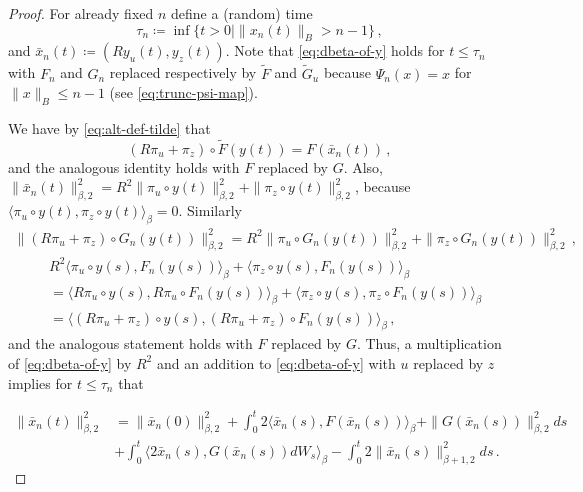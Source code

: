 \documentclass[final]{amsart}
\numberwithin{thm}{section}
\numberwithin{equation}{section}
\newcommand{\ip}[2]{\langle #1, #2 \rangle}
\begin{document}
\begin{proof}
For already fixed $n$ define a (random) time
  \begin{equation}\label{eq:def-tau-n}
        \tau_n \coloneqq \inf\{t > 0 \mid \|x_n(t)\|_B > n - 1\} \,,
    \end{equation}
and $\bar x_n(t) \coloneqq (Ry_u(t), y_z(t))$.
Note that \eqref{eq:dbeta-of-y} holds for $t\leq \tau_n$ with 
$F_n$ and $G_n$ replaced respectively by $\tilde{F}$ and $\tilde{G}_u$ because $\Psi_n(x) = x$ for $\|x\|_B \leq n - 1$ (see \eqref{eq:trunc-psi-map}). 
  
 



  

    
We have by \eqref{eq:alt-def-tilde} that
    $$
    (R\pi_u + \pi_z)\circ \tilde{F}(y(t)) = 
    F(\bar{x}_n(t)) \,,$$
    and the analogous identity holds with $F$ replaced by $G$. Also, $\|\bar{x}_n(t)\|_{\beta,2}^2 = R^2\|\pi_u \circ y(t)\|_{\beta,2}^2 + \|\pi_z \circ y(t)\|_{\beta,2}^2$, because $\ip{\pi_u \circ y(t)}{\pi_z \circ y(t)}_\beta = 0$. Similarly 
    \begin{align*}
      \|(R\pi_u + \pi_z)\circ G_n(y(t))\|_{\beta,2}^2 = R^2\|\pi_u \circ G_n(y(t))\|_{\beta,2}^2 + \|\pi_z \circ G_n(y(t))\|_{\beta,2}^2  \,,
    \end{align*}
    \begin{align*}
        &R^2\ip{\pi_u \circ y(s)}{F_n(y(s))}_\beta + \ip{\pi_z \circ y(s)}{F_n(y(s))}_\beta \\&=  \ip{R\pi_u \circ y(s)}{R\pi_u \circ F_n(y(s))}_\beta + \ip{\pi_z \circ y(s)}{\pi_z \circ F_n(y(s))}_\beta \\
        &= \ip{(R\pi_u + \pi_z)\circ y(s)}{(R\pi_u + \pi_z)\circ F_n(y(s))}_\beta\,,
    \end{align*}
    and the analogous statement holds with $F$ replaced by $G$.
    Thus, a multiplication of \eqref{eq:dbeta-of-y} by $R^2$ and an addition  to \eqref{eq:dbeta-of-y} with $u$ replaced by $z$ implies
    for $t \leq \tau_n$ that
    
    \begin{equation*}
        \begin{aligned}
         \|\bar{x}_n(t)\|_{\beta,2}^2 &= \|\bar{x}_n(0)\|_{\beta,2}^2 + \int_0^t 2\ip{\bar{x}_n(s)}{F(\bar{x}_n(s))}_\beta + \|G(\bar{x}_n(s))\|_{\beta,2}^2 ds \\
         &+ \int_0^t \ip{2\bar{x}_n(s)}{G(\bar{x}_n(s))dW_s}_\beta - \int_0^t 2\|\bar{x}_n(s)\|_{\beta+1,2}^2ds \,.
    \end{aligned}
    \end{equation*}
    

\end{proof}
\end{document}
